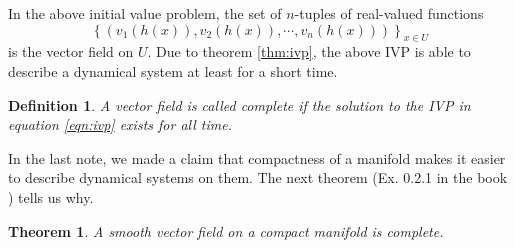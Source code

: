 \documentclass[11pt]{article}
\newtheorem{theorem}{Theorem}[section]
\newtheorem{definition}{Definition}
\begin{document}
In the above initial value problem, the set of $n$-tuples of real-valued 
functions 
$$\left\{ (v_1(h(x)),v_2(h(x)),\cdots,v_n(h(x))) \right\}_{x \in U}$$ is the vector field on $U$. Due to theorem \ref{thm:ivp}, the above IVP is able
to describe a dynamical system at least for a short time.  
\begin{definition}
A vector field is called \emph{complete} if the solution to 
the IVP in equation \ref{eqn:ivp} exists for all time.  
\end{definition}

In the last note, we made a claim that compactness of a 
manifold makes it easier to describe dynamical systems 
on them. The next theorem (Ex. 0.2.1 in the book \cite{katok}) 
tells us why.

\begin{theorem}
A smooth vector field on a compact manifold is complete.
\end{theorem}




\end{document}

